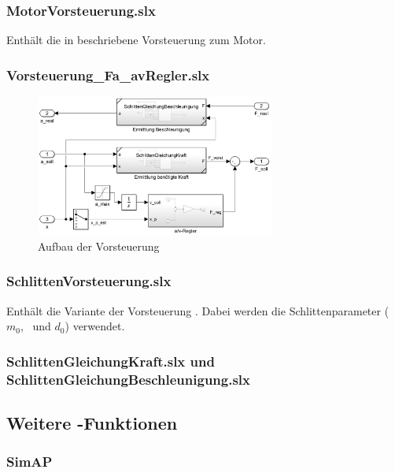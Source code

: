 \subsubsection{MotorVorsteuerung.slx}
Enthält die in  beschriebene Vorsteuerung zum Motor.

\subsubsection{Vorsteuerung\_Fa\_avRegler.slx}


\begin{figure}
	\centering
		\includegraphics[width=0.7\textwidth]{Bilder/Simulink/Fa_vorst.PNG}
	\caption{Aufbau der Vorsteuerung}
	\label{fig:simfav}
\end{figure}

\subsubsection{SchlittenVorsteuerung.slx}
Enthält die  Variante der Vorsteuerung .
Dabei werden die Schlittenparameter ($m_0$, \Fco\ und $d_0$) verwendet. 

\subsubsection{SchlittenGleichungKraft.slx und SchlittenGleichungBeschleunigung.slx}


\subsection{\init}



\subsection{Weitere \Matlab-Funktionen}

\subsubsection{SimAP}


